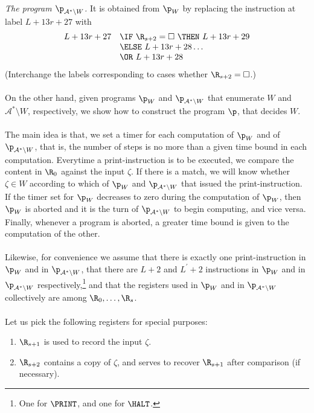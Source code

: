 \begin{enumerate}[1.]
\begin{enumerate}[(a)]
\begin{enumerate}[(1)]
\end{enumerate}
\ \\
\emph{The program $\p_{\mathcal{A}^\ast \setminus W}$.} It is obtained from $\p_W$ by replacing the instruction at label $L + 13r + 27$ with
\[
\begin{array}{rl}
L + 13r + 27 & \IF \ \R_{s + 2} = \Box \ \THEN \ L + 13r + 29 \cr
\ & \ELSE \ L + 13r + 28 \ldots \cr
\ & \OR \ L + 13r + 28 \cr
\end{array}
\]
(Interchange the labels corresponding to cases whether $\R_{s + 2} = \Box$.)\\
\ \\
On the other hand, given programs $\p_W$ and $\p_{\mathcal{A}^\ast \setminus W}$ that enumerate $W$ and $\mathcal{A}^\ast \setminus W$, respectively, we show how to construct the program $\p$, that decides $W$.\\
\ \\
The main idea is that, we set a timer for each computation of $\p_W$ and of $\p_{\mathcal{A}^\ast \setminus W}$, that is, the number of steps is no more than a given time bound in each computation. Everytime a print-instruction is to be executed, we compare the content in $\R_0$ against the input $\zeta$. If there is a match, we will know whether $\zeta \in W$ according to which of $\p_W$ and $\p_{\mathcal{A}^\ast \setminus W}$ that issued the print-instruction. If the timer set for $\p_W$ decreases to zero during the computation of $\p_W$, then $\p_W$ is aborted and it is the turn of $\p_{\mathcal{A}^\ast \setminus W}$ to begin computing, and vice versa. Finally, whenever a program is aborted, a greater time bound is given to the computation of the other.\\
\ \\
Likewise, for convenience we assume that there is exactly one print-instruction in $\p_W$ and in $\p_{\mathcal{A}^\ast \setminus W}$, that there are $L + 2$ and $L^\prime + 2$ instructions in $\p_W$ and in $\p_{\mathcal{A}^\ast \setminus W}$ respectively,\footnote{One for $\PRINT$, and one for $\HALT$.} and that the registers used in $\p_W$ and in $\p_{\mathcal{A}^\ast \setminus W}$ collectively are among $\R_0, \ldots, \R_s$.\\
\ \\
Let us pick the following registers for special purposes:
\begin{enumerate}[1)]
\item $\R_{s + 1}$ is used to record the input $\zeta$.
\item $\R_{s + 2}$ contains a copy of $\zeta$, and serves to recover $\R_{s + 1}$ after comparison (if necessary).

\end{enumerate}
\end{enumerate}
\end{enumerate}
